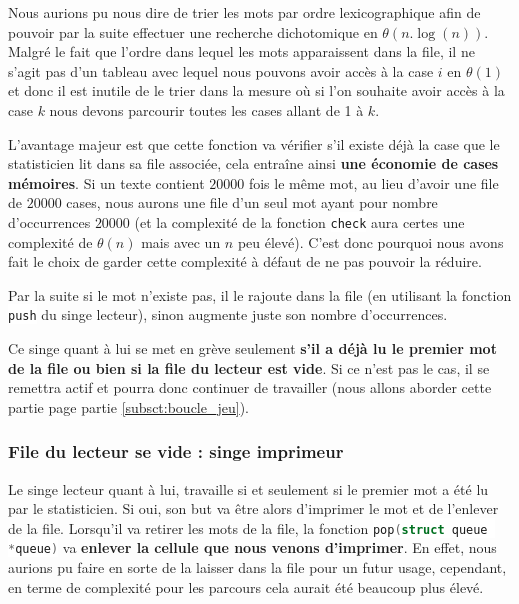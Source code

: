 \documentclass{article}
\newcommand{\inlinecode}[2]{\colorbox{white}{\lstinline[language=#1]$#2$}}
\begin{document}
Nous aurions pu nous dire de trier les mots par ordre lexicographique afin de pouvoir par la suite effectuer une recherche dichotomique en $\theta(n.\log(n))$. Malgré le fait que l'ordre dans lequel les mots apparaissent dans la file, il ne s'agit pas d'un tableau avec lequel nous pouvons avoir accès à la case $i$ en $\theta(1)$ et donc il est inutile de le trier dans la mesure où si l'on souhaite avoir accès à la case $k$ nous devons parcourir toutes les cases allant de 1 à $k$.

L'avantage majeur est que cette fonction va vérifier s'il existe déjà la case que le statisticien lit dans sa file associée, cela entraîne ainsi \textbf{une économie de cases mémoires}. Si un texte contient $20000$ fois le même mot, au lieu d'avoir une file de $20000$ cases, nous aurons une file d'un seul mot ayant pour nombre d'occurrences $20000$ (et la complexité de la fonction \inlinecode{C}{check} aura certes une complexité de $\theta(n)$ mais avec un $n$ peu élevé). C'est donc pourquoi nous avons fait le choix de garder cette complexité à défaut de ne pas pouvoir la réduire.

Par la suite si le mot n'existe pas, il le rajoute dans la file (en utilisant la fonction \inlinecode{C}{push} du singe lecteur), sinon augmente juste son nombre d'occurrences.

Ce singe quant à lui se met en grève seulement \textbf{s'il a déjà lu le premier mot de la file ou bien si la file du lecteur est vide}. Si ce n'est pas le cas, il se remettra actif et pourra donc continuer de travailler (nous allons aborder cette partie page \pageref{subsct:boucle_jeu} partie \ref{subsct:boucle_jeu}).


\subsubsection{File du lecteur se vide : singe imprimeur}
\label{subsct:printer}

Le singe lecteur quant à lui, travaille si et seulement si le premier mot a été lu par le statisticien. Si oui, son but va être alors d'imprimer le mot et de l'enlever de la file. Lorsqu'il va retirer les mots de la file, la fonction \inlinecode{C}{pop(struct queue *queue)} \label{lst:pop_explications} va \textbf{enlever la cellule que nous venons d'imprimer}. En effet, nous aurions pu faire en sorte de la laisser dans la file pour un futur usage, cependant, en terme de complexité pour les parcours cela aurait été beaucoup plus élevé.
\end{document}

